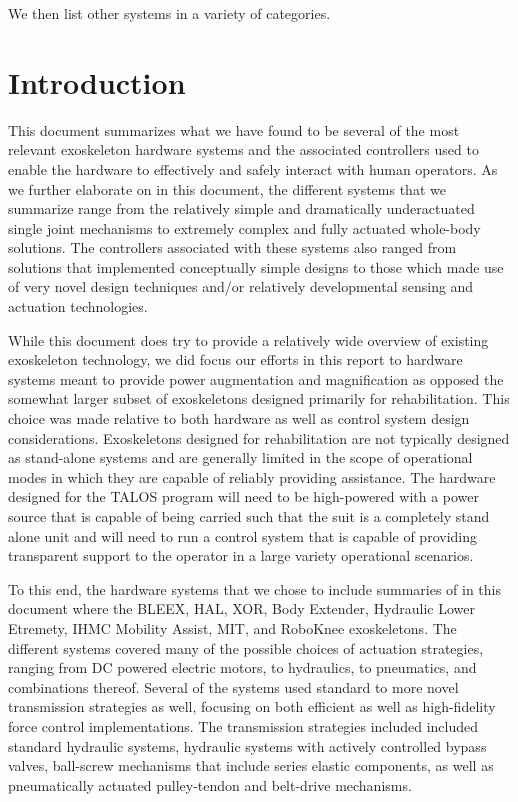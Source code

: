 \documentclass[letterpaper,12pt,fullpage]{article}
\begin{document}
We then list other systems in a variety of categories.

\section{Introduction}

This document summarizes what we have found to be several of the most relevant exoskeleton hardware systems and the associated controllers used to enable the hardware to effectively and safely interact with human operators.  As we further elaborate on in this document, the different systems that we summarize range from the relatively simple and dramatically underactuated single joint mechanisms to extremely complex and fully actuated whole-body solutions.  The controllers associated with these systems also ranged from solutions that implemented conceptually simple designs to those which made use of very novel design techniques and/or relatively developmental sensing and actuation technologies. 

While this document does try to provide a relatively wide overview of existing exoskeleton technology, we did focus our efforts in this report to hardware systems meant to provide power augmentation and magnification as opposed the somewhat larger subset of exoskeletons designed primarily for rehabilitation.  This choice was made relative to both hardware as well as control system design considerations.  Exoskeletons designed for rehabilitation are not typically designed as stand-alone systems and are generally limited in the scope of operational modes in which they are capable of reliably providing assistance.  The hardware designed for the TALOS program will need to be high-powered with a power source that is capable of being carried such that the suit is a completely stand alone unit and will need to run a control system that is capable of providing transparent support to the operator in a large variety operational scenarios.

To this end, the hardware systems that we chose to include summaries of in this document where the BLEEX, HAL, XOR, Body Extender, Hydraulic Lower Etremety, IHMC Mobility Assist, MIT, and RoboKnee exoskeletons.  The different systems covered many of the possible choices of actuation strategies, ranging from DC powered electric motors, to hydraulics, to pneumatics, and combinations thereof.  Several of the systems used standard to more novel transmission strategies as well, focusing on both efficient as well as high-fidelity force control implementations.  The transmission strategies included included standard hydraulic systems, hydraulic systems with actively controlled bypass valves, ball-screw mechanisms that include series elastic components, as well as pneumatically actuated pulley-tendon and belt-drive mechanisms. 
\end{document}
